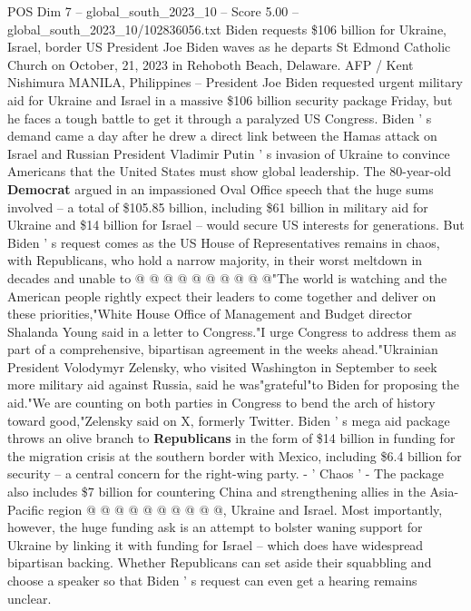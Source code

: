 \begin{textsample}{POS Dim 7 – global\_south\_2023\_10 – Score 5.00 – global\_south\_2023\_10/102836056.txt}  \label{ex:f7_pos_386}
Biden requests \$106 billion for Ukraine, Israel, border US President Joe Biden waves as he departs St Edmond Catholic Church on October, 21, 2023 in Rehoboth Beach, Delaware.
AFP / Kent Nishimura MANILA, Philippines -- President Joe Biden requested urgent military aid for Ukraine and Israel in a massive \$106 billion security package Friday, but he faces a tough battle to get it through a paralyzed US Congress.
Biden ' s demand came a day after he drew a direct link between the Hamas attack on Israel and Russian President Vladimir Putin ' s invasion of Ukraine to convince Americans that the United States must show global leadership.
The 80-year-old \textbf{Democrat} argued in an impassioned Oval Office speech that the huge sums involved -- a total of \$105.85 billion, including \$61 billion in military aid for Ukraine and \$14 billion for Israel -- would secure US interests for generations.
But Biden ' s request comes as the US House of Representatives remains in chaos, with Republicans, who hold a narrow majority, in their worst meltdown in decades and unable to @ @ @ @ @ @ @ @ @ @"The world is watching and the American people rightly expect their leaders to come together and deliver on these priorities,"White House Office of Management and Budget director Shalanda Young said in a letter to Congress."I urge Congress to address them as part of a comprehensive, bipartisan agreement in the weeks ahead."Ukrainian President Volodymyr Zelensky, who visited Washington in September to seek more military aid against Russia, said he was"grateful"to Biden for proposing the aid."We are counting on both parties in Congress to bend the arch of history toward good,"Zelensky said on X, formerly Twitter.
Biden ' s mega aid package throws an olive branch to \textbf{Republicans} in the form of \$14 billion in funding for the migration crisis at the southern border with Mexico, including \$6.4 billion for security -- a central concern for the right-wing party. - ' Chaos ' - The package also includes \$7 billion for countering China and strengthening allies in the Asia-Pacific region @ @ @ @ @ @ @ @ @ @, Ukraine and Israel.
Most importantly, however, the huge funding ask is an attempt to bolster waning support for Ukraine by linking it with funding for Israel -- which does have widespread bipartisan backing.
Whether Republicans can set aside their squabbling and choose a speaker so that Biden ' s request can even get a hearing remains unclear.

\end{textsample}
